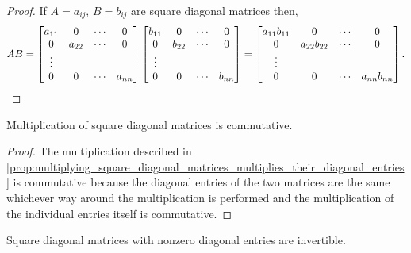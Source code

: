 \documentclass[MathsNotesBase.tex]{subfiles}
\begin{document}
{		\medskip
		\begin{proof}
				If ${ A = a_{ij},\, B = b_{ij} }$ are square diagonal matrices then,
			\[  AB = 
				\begin{bmatrix}
				a_{11} & 0      & \cdots & 0\\
				0 	   & a_{22} & \cdots & 0\\
				\vdots\\
				0 	   & 0 	    & \cdots & a_{nn}
				\end{bmatrix}
				\begin{bmatrix}
				b_{11} & 0      & \cdots & 0\\
				0 	   & b_{22} & \cdots & 0\\
				\vdots\\
				0 	   & 0 	    & \cdots & b_{nn}
				\end{bmatrix} =
				\begin{bmatrix}
				a_{11}b_{11} & 0            & \cdots & 0\\
				0 	         & a_{22}b_{22} & \cdots & 0\\
				\vdots\\
				0 	         & 0 	        & \cdots & a_{nn}b_{nn}
				\end{bmatrix}. \qedhere
			\]
		\end{proof}
		\begin{corollary}
			\label{coro:multiplication_of_square_diagonal_matrices_is_commutative}
			Multiplication of square diagonal matrices is commutative.
		\end{corollary}
		\begin{proof}
			The multiplication described in \autoref{prop:multiplying_square_diagonal_matrices_multiplies_their_diagonal_entries} is commutative because the diagonal entries of the two matrices are the same whichever way around the multiplication is performed and the multiplication of the individual entries itself is commutative.
		\end{proof}
		\begin{corollary}
			\label{coro:square_diagonal_matrices_with_nonzero_diag_entries_invertible}
			Square diagonal matrices with nonzero diagonal entries are invertible.

\end{corollary}}
\end{document}
